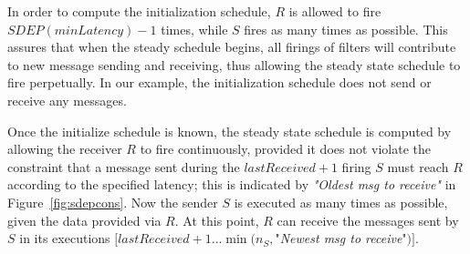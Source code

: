In order  to compute  the initialization schedule,  $R$ is  allowed to
fire  $SDEP(minLatency)-1$ times,  while $S$  fires as  many  times as
possible.   This assures  that when  the steady  schedule  begins, all
firings  of  filters  will  contribute  to  new  message  sending  and
receiving,   thus  allowing   the  steady   state  schedule   to  fire
perpetually. In our example, the initialization schedule does not send
or receive any messages.

Once the  initialize schedule is  known, the steady state  schedule is
computed by  allowing the receiver $R$ to  fire continuously, provided
it  does not violate  the constraint  that a  message sent  during the
$lastReceived+1$ firing $S$ must  reach $R$ according to the specified
latency;  this  is indicated  by  {\it  "Oldest  msg to  receive"}  in
Figure~\ref{fig:sdepcons}.  Now the  sender  $S$ is  executed as  many
times as possible, given the data provided via $R$. At this point, $R$
can receive the messages sent  by $S$ in  its executions
$[lastReceived+1  ... \min(n_S,$"{\it Newest msg to receive}"$)]$.

